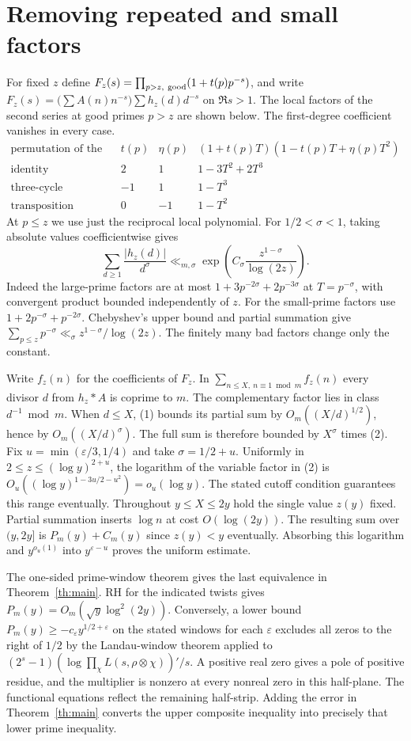 \documentclass[11pt]{article}
\newcommand{\eps}{\varepsilon}
\begin{document}
\section{Removing repeated and small factors}
For fixed $z$ define $F_z(s)=\prod_{p>z,\ {\rm good}}(1+t(p)p^{-s})$, and write $F_z(s)=\bigl(\sum A(n)n^{-s}\bigr)\sum h_z(d)d^{-s}$ on $\Re s>1$. The local factors of the second series at good primes $p>z$ are shown below. The first-degree coefficient vanishes in every case.
\[
\begin{array}{c|r|r|l}
 \text{permutation of the roots}&t(p)&\eta(p)&(1+t(p)T)(1-t(p)T+\eta(p)T^2)\\ \hline
 \text{identity}&2&1&1-3T^2+2T^3\\
 \text{three-cycle}&-1&1&1-T^3\\
 \text{transposition}&0&-1&1-T^2
\end{array}
\]
At $p\le z$ we use just the reciprocal local polynomial. For $1/2<\sigma<1$, taking absolute values coefficientwise gives
\[
 \sum_{d\ge1}\frac{|h_z(d)|}{d^\sigma}
 \ll_{m,\sigma}
          \exp\!\left(C_\sigma\frac{z^{1-\sigma}}{\log(2z)}\right).
                                                                      \tag{2}
\]
Indeed the large-prime factors are at most $1+3p^{-2\sigma}+2p^{-3\sigma}$ at $T=p^{-\sigma}$, with convergent product bounded independently of $z$. For the small-prime factors use $1+2p^{-\sigma}+p^{-2\sigma}$. Chebyshev's upper bound and partial summation give $\sum_{p\le z}p^{-\sigma}\ll_\sigma z^{1-\sigma}/\log(2z)$. The finitely many bad factors change only the constant.

Write $f_z(n)$ for the coefficients of $F_z$. In $\sum_{n\le X,\ n\equiv1\bmod m}f_z(n)$ every divisor $d$ from $h_z*A$ is coprime to $m$. The complementary factor lies in class $d^{-1}\bmod m$.
When $d\le X$, (1) bounds its partial sum by $O_m((X/d)^{1/2})$, hence by $O_m((X/d)^\sigma)$. The full sum is therefore bounded by $X^\sigma$ times (2). Fix $u=\min(\eps/3,1/4)$ and take $\sigma=1/2+u$. Uniformly in $2\le z\le(\log y)^{2+u}$, the logarithm of the variable factor in (2) is $O_u((\log y)^{1-3u/2-u^2})=o_u(\log y)$. The stated cutoff condition guarantees this range eventually. Throughout $y\le X\le2y$ hold the single value $z(y)$ fixed. Partial summation inserts $\log n$ at cost $O(\log(2y))$. The resulting sum over $(y,2y]$ is $P_m(y)+C_m(y)$ since $z(y)<y$ eventually. Absorbing this logarithm and $y^{o_u(1)}$ into $y^{\eps-u}$ proves the uniform estimate.

The one-sided prime-window theorem \cite{window} gives the last equivalence in Theorem~\ref{th:main}. RH for the indicated twists gives $P_m(y)=O_m(\sqrt y\log^2(2y))$. Conversely, a lower bound $P_m(y)\ge-c_\eps y^{1/2+\eps}$ on the stated windows for each $\eps$ excludes all zeros to the right of $1/2$ by the Landau-window theorem applied to $(2^s-1)(\log\prod_\chi L(s,\rho\otimes\chi))'/s$. A positive real zero gives a pole of positive residue, and the multiplier is nonzero at every nonreal zero in this half-plane. The functional equations reflect the remaining half-strip. Adding the error in Theorem~\ref{th:main} converts the upper composite inequality into precisely that lower prime inequality.
\end{document}
